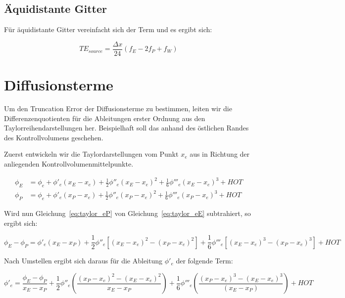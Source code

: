 \documentclass[10pt, ngerman,colorback,accentcolor=tud2d]{tudreport}
\begin{document}
\subsection{Äquidistante Gitter}

Für äquidistante Gitter vereinfacht sich der Term und es ergibt sich:

\begin{equation*}
  TE_{source} = \frac{\Delta x}{24} \left({f_E-2f_P+f_W}\right)
\end{equation*}

\section{Diffusionsterme}
\label{sec:Diffusionsterme}


Um den Truncation Error der Diffusionsterme zu bestimmen, leiten wir die Differenzenquotienten
für die Ableitungen erster Ordnung aus den Taylorreihendarstellungen her. Beispielhaft
soll das anhand des östlichen Randes des Kontrollvolumens geschehen.

Zuerst entwickeln wir die Taylordarstellungen vom Punkt $x_e$ aus in Richtung der anliegenden
Kontrollvolumenmittelpunkte.

\begin{align}
  \phi_E &= \phi_e + \phi'_e(x_E-x_e)+\frac{1}{2}\phi''_e(x_E-x_e)^2
  +\frac{1}{6}\phi'''_e(x_E-x_e)^3+HOT
  \label{eq:taylor_eE}\\
  \phi_P &= \phi_e + \phi'_e(x_P-x_e)+\frac{1}{2}\phi''_e(x_P-x_e)^2
  +\frac{1}{6}\phi'''_e(x_P-x_e)^3+HOT
  \label{eq:taylor_eP}
\end{align}

Wird nun Gleichung~\eqref{eq:taylor_eP} von Gleichung~\eqref{eq:taylor_eE} subtrahiert, 
so ergibt sich:

\begin{equation*}
  \phi_E-\phi_P=\phi'_e(x_E-x_P)+
  \frac{1}{2}\phi''_e\left[{{(x_E-x_e)}^2-{(x_P-x_e)}^2}\right]+
  \frac{1}{6}\phi'''_e\left[{{(x_E-x_e)}^3-{(x_P-x_e)}^3}\right]+HOT
\end{equation*}

Nach Umstellen ergibt sich daraus für die Ableitung $\phi'_e$ der folgende Term:

\begin{equation}
  \phi'_e = \frac{\phi_E-\phi_P}{x_E-x_P}+\frac{1}{2}\phi''_e
\left({\frac{{(x_P-x_e)}^2-{(x_E-x_e)}^2}{x_E-x_P}}\right)+
\frac{1}{6} \phi'''_e \left({\frac{{(x_P-x_e)}^3-{(x_E-x_e)}^3}{(x_E-x_P)}}\right)+HOT
\end{equation}
\end{document}
